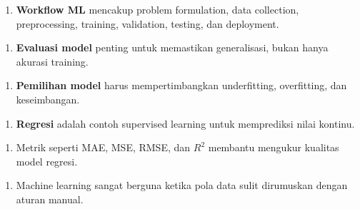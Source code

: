 \documentclass[12pt,a4paper]{article}
\begin{document}
\begin{enumerate}
\item \textbf{Workflow ML} mencakup problem formulation, data collection, preprocessing, training, validation, testing, dan deployment.
\end{enumerate}

\begin{enumerate}
\item \textbf{Evaluasi model} penting untuk memastikan generalisasi, bukan hanya akurasi training.
\end{enumerate}

\begin{enumerate}
\item \textbf{Pemilihan model} harus mempertimbangkan underfitting, overfitting, dan keseimbangan.
\end{enumerate}

\begin{enumerate}
\item \textbf{Regresi} adalah contoh supervised learning untuk memprediksi nilai kontinu.
\end{enumerate}

\begin{enumerate}
\item Metrik seperti MAE, MSE, RMSE, dan $R^2$ membantu mengukur kualitas model regresi.
\end{enumerate}

\begin{enumerate}
\item Machine learning sangat berguna ketika pola data sulit dirumuskan dengan aturan manual.
\end{enumerate}
\end{document}
